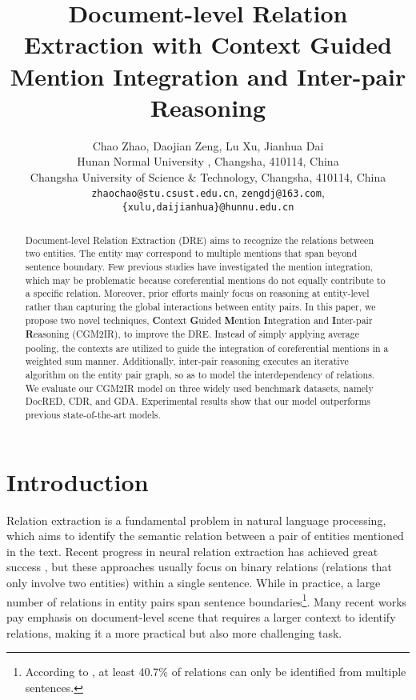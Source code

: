 \documentclass[11pt]{article}
\title{Document-level Relation Extraction with Context Guided Mention Integration and Inter-pair Reasoning}
\author{Chao Zhao, Daojian Zeng, Lu Xu, Jianhua Dai \\
        \textsuperscript{\rm }Hunan Normal University , Changsha, 410114, China \\ \textsuperscript{\rm } Changsha University of Science \& Technology, Changsha, 410114, China\\ \texttt{zhaochao@stu.csust.edu.cn},  \texttt{zengdj@163.com},\texttt{\{xulu,daijianhua\}@hunnu.edu.cn}}
\begin{document}
\maketitle
\begin{abstract}




Document-level Relation Extraction (DRE) aims to recognize the relations between two entities.
The entity may correspond to multiple mentions that span beyond sentence boundary.
Few previous studies have investigated the mention integration, which may be problematic because coreferential mentions do not equally contribute to a specific relation.
Moreover, prior efforts mainly focus on reasoning at entity-level rather than capturing the global interactions between entity pairs.
In this paper, we propose two novel techniques, \textbf{C}ontext \textbf{G}uided \textbf{M}ention \textbf{I}ntegration and \textbf{I}nter-pair \textbf{R}easoning (CGM2IR), to improve the DRE.
Instead of simply applying average pooling, the contexts are utilized to guide the integration of coreferential mentions in a weighted sum manner.
Additionally, inter-pair reasoning executes an iterative algorithm on the entity pair graph, so as to model the interdependency of relations.
We evaluate our CGM2IR model on three widely used benchmark datasets, namely DocRED, CDR, and GDA. 
Experimental results show that our model outperforms previous state-of-the-art models.
\end{abstract}

\section{Introduction}
\label{sec:intro}
Relation extraction is a fundamental problem in natural language processing, which aims to identify the semantic relation between a pair of entities mentioned in the text.
Recent progress in neural relation extraction has achieved great success \cite{zeng-etal-2015-distant,baldini-soares-etal-2019-matching}, but these approaches usually focus on binary relations (relations that only involve two entities) within a single sentence.
While in practice, a large number of relations in entity pairs span sentence boundaries\footnote{According to \citet{yao-etal-2019-docred}, at least 40.7\% of relations can only be identified from multiple sentences.}.
Many recent works \cite {yao-etal-2019-docred,DBLP:conf/aaai/Zhou0M021} pay emphasis on document-level scene that requires a larger context to identify relations, making it a more practical but also more challenging task.
\end{document}
